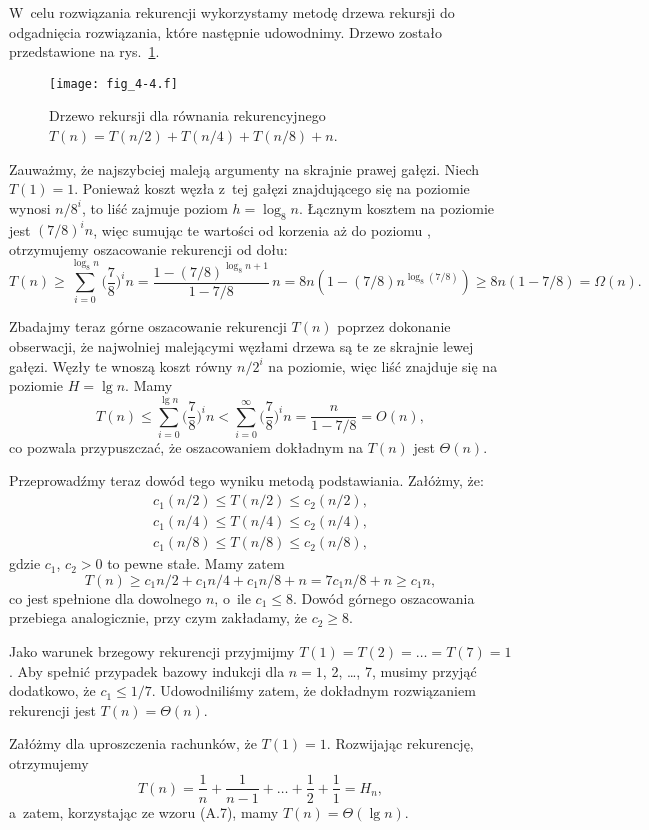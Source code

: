 \subproblem %
W~celu rozwiązania rekurencji wykorzystamy metodę drzewa rekursji do odgadnięcia rozwiązania, które następnie udowodnimy.
Drzewo zostało przedstawione na rys.\ \ref{fig:4-4f}.
\begin{figure}[ht]
	\centering \texttt{[image: fig\_4-4.f]}
	\caption{Drzewo rekursji dla równania rekurencyjnego $T(n)=T(n/2)+T(n/4)+T(n/8)+n$.} \label{fig:4-4f}
\end{figure}

Zauważmy, że najszybciej maleją argumenty na skrajnie prawej gałęzi.
Niech $T(1)=1$.
Ponieważ koszt węzła z~tej gałęzi znajdującego się na  poziomie wynosi $n/8^i$, to liść zajmuje poziom $h=\log_8n$.
Łącznym kosztem na  poziomie jest $(7/8)^in$, więc sumując te wartości od korzenia aż do poziomu , otrzymujemy oszacowanie rekurencji od dołu:
\[
	T(n) \ge \sum_{i=0}^{\log_8n}\biggl(\frac{7}{8}\biggr)^in = \frac{1-(7/8)^{\log_8n+1}}{1-7/8}\,n = 8n(1-(7/8)n^{\log_8(7/8)}) \ge 8n(1-7/8) = \Omega(n).
\]

Zbadajmy teraz górne oszacowanie rekurencji $T(n)$ poprzez dokonanie obserwacji, że najwolniej malejącymi węzłami drzewa są te ze skrajnie lewej gałęzi.
Węzły te wnoszą koszt równy $n/2^i$ na  poziomie, więc liść znajduje się na poziomie $H=\lg n$.
Mamy
\[
	T(n) \le \sum_{i=0}^{\lg n}\biggl(\frac{7}{8}\biggr)^in < \sum_{i=0}^\infty\biggl(\frac{7}{8}\biggr)^in = \frac{n}{1-7/8} = O(n),
\]
co pozwala przypuszczać, że oszacowaniem dokładnym na $T(n)$ jest $\Theta(n)$.

Przeprowadźmy teraz dowód tego wyniku metodą podstawiania.
Załóżmy, że:
\begin{gather*}
	c_1(n/2) \le T(n/2) \le c_2(n/2), \\
	c_1(n/4) \le T(n/4) \le c_2(n/4), \\
	c_1(n/8) \le T(n/8) \le c_2(n/8),
\end{gather*}
gdzie $c_1$, $c_2>0$ to pewne stałe.
Mamy zatem
\[
	T(n) \ge c_1n/2+c_1n/4+c_1n/8+n = 7c_1n/8+n \ge c_1n,
\]
co jest spełnione dla dowolnego $n$, o~ile $c_1\le8$.
Dowód górnego oszacowania przebiega analogicznie, przy czym zakładamy, że $c_2\ge8$.

Jako warunek brzegowy rekurencji przyjmijmy $T(1)=T(2)=\dots=T(7)=1$.
Aby spełnić przypadek bazowy indukcji dla $n=1$, 2, \dots, 7, musimy przyjąć dodatkowo, że $c_1\le1/7$.
Udowodniliśmy zatem, że dokładnym rozwiązaniem rekurencji jest $T(n)=\Theta(n)$.

\subproblem %
Załóżmy dla uproszczenia rachunków, że $T(1)=1$.
Rozwijając rekurencję, otrzymujemy
\[
	T(n) = \frac{1}{n}+\frac{1}{n-1}+\dots+\frac{1}{2}+\frac{1}{1} = H_n,
\]
a~zatem, korzystając ze wzoru (A.7), mamy $T(n)=\Theta(\lg n)$.

